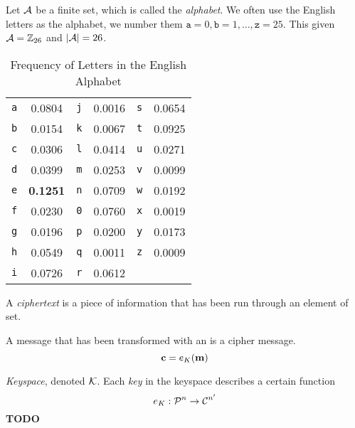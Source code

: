 \begin{definition}[Alphabet]\label{def:Alphabet}
  Let $\operatorname{\mathcal{A}}$ be a finite set, which is called the \emph{alphabet}.
  We often use the English letters as the alphabet, we number them $\mathtt{a} = 0, \mathtt{b} = 1, \ldots, \mathtt{z} = 25$.
  This given $\operatorname{\mathcal{A}} = \operatorname{\mathbb{Z}}_{26}$ and $\lvert \operatorname{\mathcal{A}} \rvert = 26$.

  \begin{table}[h!]
    \centering
    \begin{tabular}{cccccc}
      \toprule
      \texttt{a} & 0.0804 & \texttt{j} & 0.0016 & \texttt{s} & 0.0654 \\
      \texttt{b} & 0.0154 & \texttt{k} & 0.0067 & \texttt{t} & 0.0925 \\
      \texttt{c} & 0.0306 & \texttt{l} & 0.0414 & \texttt{u} & 0.0271 \\
      \texttt{d} & 0.0399 & \texttt{m} & 0.0253 & \texttt{v} & 0.0099 \\
      \texttt{e} & \textbf{0.1251} & \texttt{n} & 0.0709 & \texttt{w} & 0.0192 \\
      \texttt{f} & 0.0230 & \texttt{0} & 0.0760 & \texttt{x} & 0.0019 \\
      \texttt{g} & 0.0196 & \texttt{p} & 0.0200 & \texttt{y} & 0.0173 \\
      \texttt{h} & 0.0549 & \texttt{q} & 0.0011 & \texttt{z} & 0.0009 \\
      \texttt{i} & 0.0726 & \texttt{r} & 0.0612 & & \\
      \bottomrule
    \end{tabular}
    \caption{Frequency of Letters in the English Alphabet}
    \label{tab:Frequency_Letters_English_Alphabet}
  \end{table}
\end{definition}

\begin{definition}[Ciphertext]\label{def:Ciphertext}
  A \emph{ciphertext} is a piece of  information that has been run through an element of  set.

  A message that has been transformed with an  is a cipher message.
  \begin{equation}\label{eq:Ciphertext}
    \operatorname{\mathbf{c}} = e_{K} (\operatorname{\mathbf{m}})
  \end{equation}
\end{definition}

\begin{definition}[Keyspace]\label{def:Keyspace}
  \emph{Keyspace}, denoted $\operatorname{\mathcal{K}}$.
  Each \emph{key} in the keyspace describes a certain function
  \begin{equation}\label{eq:Keyspace}
    e_{K} : \operatorname{\mathcal{P}}^{n} \rightarrow \operatorname{\mathcal{C}}^{n'}
  \end{equation}
  \textbf{TODO}
\end{definition}


